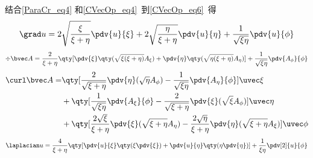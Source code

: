 结合\autoref{ParaCr_eq4} 和\autoref{CVecOp_eq4}~到\autoref{CVecOp_eq6}~得
\begin{equation}
\grad u = 2\sqrt{\frac{\xi}{\xi + \eta}}\pdv{u}{\xi} + 2\sqrt{\frac{\eta}{\xi + \eta}}\pdv{u}{\eta} + \frac{1}{\sqrt{\xi\eta}}\pdv{u}{\phi}
\end{equation}
\begin{equation}
\div \bvec A = \frac{2}{\xi + \eta}\qty[\pdv{\xi}\qty(\sqrt{\xi(\xi+\eta)}A_\xi) + \pdv{\eta}\qty(\sqrt{\eta(\xi+\eta)}A_\eta)] + \frac{1}{\sqrt{\xi\eta}} \pdv{A_\phi}{\phi}
\end{equation}
\begin{equation}
\begin{aligned}
\curl \bvec A = &\qty[\frac{2}{\sqrt{\xi+\eta}}\pdv{\eta} (\sqrt{\eta}A_\phi) - \frac{1}{\sqrt{\xi\eta}}\pdv{A_\eta}{\phi}]\uvec \xi\\
&+\qty[\frac{1}{\sqrt{\xi\eta}}\pdv{A_\xi}{\phi} - \frac{2}{\sqrt{\xi+\eta}}\pdv{\xi}(\sqrt{\xi}A_\phi)]\uvec\eta\\
&+\qty[\frac{2\sqrt{\xi}}{\xi+\eta}\pdv{\xi}(\sqrt{\xi+\eta}A_\eta) - \frac{2\sqrt{\eta}}{\xi+\eta}\pdv{\eta}(\sqrt{\xi+\eta}A_\xi)]\uvec\phi
\end{aligned}
\end{equation}
\begin{equation} %
\laplacian u = \frac{4}{\xi + \eta} \qty[\pdv{u}{\xi}\qty(\xi\pdv{\xi}) + \pdv{u}{\eta}\qty(\eta\pdv{\eta})] + \frac{1}{\xi\eta}\pdv[2]{u}{\phi}
\end{equation}
